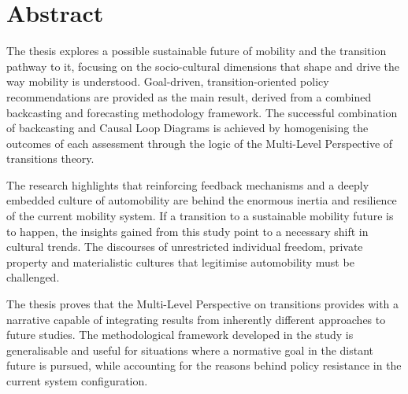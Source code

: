 \cleardoublepage %

\chapter*{Abstract} %
The thesis explores a possible sustainable future of mobility and the transition pathway to it, focusing on the socio-cultural dimensions that shape and drive the way mobility is understood. Goal-driven, transition-oriented policy recommendations are provided as the main result, derived from a combined backcasting and forecasting methodology framework. The successful combination of backcasting and Causal Loop Diagrams is achieved by homogenising the outcomes of each assessment through the logic of the Multi-Level Perspective of transitions theory.

The research highlights that reinforcing feedback mechanisms and a deeply embedded culture of automobility are behind the enormous inertia and resilience of the current mobility system. If a transition to a sustainable mobility future is to happen, the insights gained from this study point to a necessary shift in cultural trends. The discourses of unrestricted individual freedom, private property and materialistic cultures that legitimise automobility must be challenged.

The thesis proves that the Multi-Level Perspective on transitions provides with a narrative capable of integrating results from inherently different approaches to future studies. The methodological framework developed in the study is generalisable and useful for situations where a normative goal in the distant future is pursued, while accounting for the reasons behind policy resistance in the current system configuration.

\cleardoublepage %
